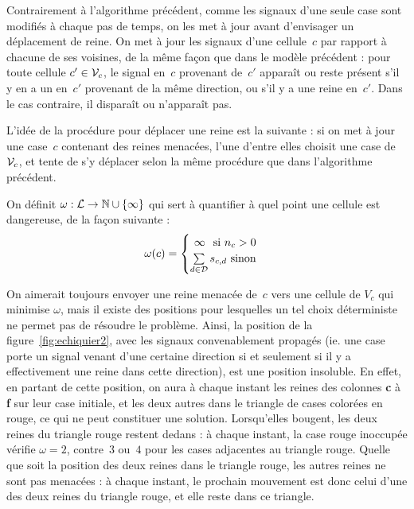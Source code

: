 
\bigskip

Contrairement à l'algorithme précédent, comme les signaux d'une seule case sont modifiés à chaque pas de temps, on les met à jour avant d'envisager un déplacement de reine. On met à jour les signaux d'une cellule~$c$ par rapport à chacune de ses voisines, de la même façon que dans le modèle précédent : pour toute cellule $c'\in\mathcal V_c$, le signal en~$c$ provenant de~$c'$ apparaît ou reste présent s'il y en a un en~$c'$ provenant de la même direction, ou s'il y a une reine en~$c'$. Dans le cas contraire, il disparaît ou n'apparaît pas.
\bigskip

L'idée de la procédure pour déplacer une reine est la suivante : si on met à jour une case~$c$ contenant des reines menacées, l'une d'entre elles choisit une case de $\mathcal V_c$, et tente de s'y déplacer selon la même procédure que dans l'algorithme précédent. 

On définit $\omega : \mathcal{L}\to\mathbb{N}\cup\{\infty\}$ qui sert à quantifier à quel point une cellule est dangereuse, de la façon suivante : \[
\omega(c) = 
\begin{cases}
  \hfill \infty \hfill \text{ si $n_c > 0$}\\
  \hfill \sum\limits_{d\in\D}s_{c,d} \hfill \text{ sinon}
\end{cases}
\]

On aimerait toujours envoyer une reine menacée de~$c$ vers une cellule de $V_c$ qui minimise $\omega$, mais il existe des positions pour lesquelles un tel choix déterministe ne permet pas de résoudre le problème. Ainsi, la position de la figure~\ref{fig:echiquier2}, avec les signaux convenablement propagés (ie. une case porte un signal venant d'une certaine direction si et seulement si il y a effectivement une reine dans cette direction), est une position insoluble. En effet, en partant de cette position, on aura à chaque instant les reines des colonnes \textbf c à \textbf f sur leur case initiale, et les deux autres dans le triangle de cases colorées en rouge, ce qui ne peut constituer une solution. 
Lorsqu'elles bougent, les deux reines du triangle rouge restent dedans : à chaque instant, la case rouge inoccupée vérifie $\omega = 2$, contre~$3$ ou~$4$ pour les cases adjacentes au triangle rouge. Quelle que soit la position des deux reines dans le triangle rouge, les autres reines ne sont pas menacées : à chaque instant, le prochain mouvement est donc celui d'une des deux reines du triangle rouge, et elle reste dans ce triangle.


